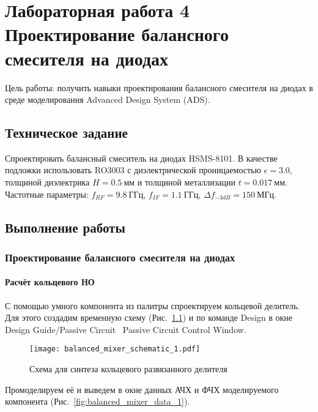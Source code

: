 \chapter{Лабораторная работа 4 \\
Проектирование балансного смесителя на диодах}

Цель работы: получить навыки проектирования балансного смесителя на диодах в среде моделирования Advanced Design System (ADS).

\section{Техническое задание}

Спроектировать балансный смеситель на диодах HSMS-8101.
В качестве подложки использовать RO3003 с диэлектрической проницаемостью $\epsilon = 3.0$, толщиной диэлектрика $H = 0.5~\text{мм}$ и толщиной металлизации $t = 0.017~\text{мм}$.
Частотные параметры: $f_{RF} = 9.8~\text{ГГц}$, $f_{IF} = 1.1~\text{ГГц}$, $\Delta f_{-3dB} = 150~\text{МГц}$.

\section{Выполнение работы}

\subsection{Проектирование балансного смесителя на диодах}

\subsubsection{Расчёт кольцевого НО}

С помощью умного компонента  из палитры  спроектируем кольцевой делитель.
Для этого создадим временную схему (Рис.~\ref{fig:balanced_mixer_schematic_1}) и по команде Design в окне Design Guide/Passive Circuit \textrightarrow\ Passive Circuit Control Window.

\begin{figure}[!ht]
    \centering
    \texttt{[image: balanced\_mixer\_schematic\_1.pdf]}
    \caption{Схема для синтеза кольцевого развязанного делителя}%
    \label{fig:balanced_mixer_schematic_1}
\end{figure}

Промоделируем её и выведем в окне данных АЧХ и ФЧХ моделируемого компонента (Рис.~\ref{fig:balanced_mixer_data_1}).

